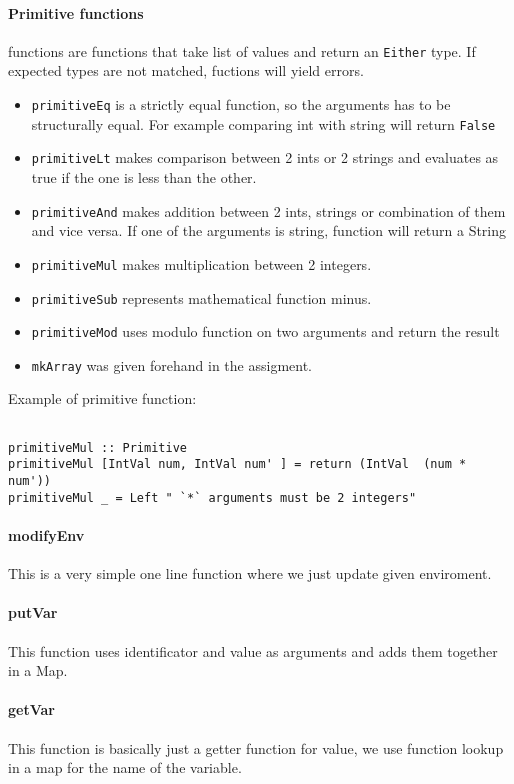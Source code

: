 \documentclass[11pt]{article}
\begin{document}
\paragraph{Primitive functions}
functions are functions that take list of values and return an \texttt{Either} type. If expected types are not matched, fuctions will yield errors. 
\begin{itemize}
\item \texttt{primitiveEq} is a strictly equal function, so the arguments has to be structurally equal. For example comparing int with string will return \texttt{False}
\item \texttt{primitiveLt} makes comparison between 2 ints or 2 strings and evaluates as true if the one is less than the other.
\item \texttt{primitiveAnd} makes addition between 2 ints, strings or combination of them and vice versa. If one of the arguments is string, function will return a String 
\item \texttt{primitiveMul} makes multiplication between 2 integers. 
\item \texttt{primitiveSub} represents mathematical function minus.
\item \texttt{primitiveMod} uses modulo function on two arguments and return the result
\item \texttt{mkArray} was given forehand in the assigment.
\end{itemize}


Example of primitive function:
\begin{verbatim}

primitiveMul :: Primitive
primitiveMul [IntVal num, IntVal num' ] = return (IntVal  (num * num'))
primitiveMul _ = Left " `*` arguments must be 2 integers"

\end{verbatim}


\paragraph{modifyEnv}
This is a very simple one line function where we just update given enviroment.
\paragraph{putVar}
This function uses identificator and value as arguments and adds them together in a Map.
\paragraph{getVar}
This function is basically just a getter function for value, we use function lookup in a map for the name of the variable.
\end{document}
